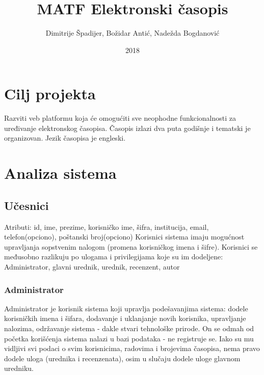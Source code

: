 \documentclass[a4paper]{article}
\title{MATF Elektronski časopis}
\date{2018}
\author{Dimitrije Špadijer, Božidar Antić, Nadežda Bogdanović}
\begin{document}
\maketitle
\newpage
\tableofcontents
\newpage

\section{Cilj projekta}

Razviti veb platformu koja će omogućiti sve neophodne funkcionalnosti za uređivanje elektronskog časopisa. Časopis izlazi dva puta godišnje i tematski je organizovan. Jezik časopisa je engleski.

\section{ Analiza sistema}

\subsection{Učesnici}

    Atributi: id, ime, prezime, korisničko ime, šifra, institucija, email, telefon(opciono), poštanski broj(opciono)
    Korisnici sistema imaju mogućnost upravljanja sopstvenim nalogom (promena korisničkog imena i šifre). Korisnici se međusobno razlikuju po ulogama i privilegijama koje su im dodeljene: Administrator, glavni urednik, urednik, recenzent, autor

    \subsubsection{Administrator}
    Administrator je korisnik sistema koji upravlja podešavanjima sistema: dodele korisničkih imena i šifara, dodavanje i uklanjanje novih korisnika, upravljanje nalozima, održavanje sistema - dakle stvari tehnološke prirode. On se odmah od početka korišćenja sistema nalazi u bazi podataka - ne registruje se. Iako su mu vidljivi svi podaci o svim korisnicima, radovima i brojevima časopisa, nema pravo dodele uloga (urednika i recenzenata), osim u slučaju dodele uloge glavnom uredniku.
    
\end{document}
